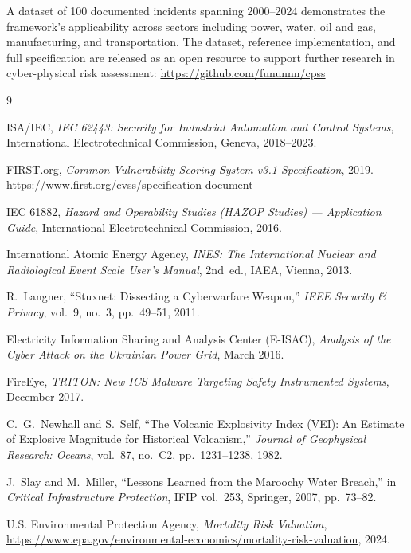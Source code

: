 \documentclass[11pt]{article}
\begin{document}
A dataset of 100 documented incidents spanning 2000--2024 demonstrates
the framework's applicability across sectors including power, water,
oil and gas, manufacturing, and transportation.
The dataset, reference implementation, and full specification are
released as an open resource to support further research in
cyber-physical risk assessment:
\url{https://github.com/fununnn/cpss}


\begin{thebibliography}{9}

ISA/IEC,
\emph{IEC 62443: Security for Industrial Automation and Control Systems},
International Electrotechnical Commission, Geneva, 2018--2023.

FIRST.org,
\emph{Common Vulnerability Scoring System v3.1 Specification},
2019.
\url{https://www.first.org/cvss/specification-document}

IEC 61882,
\emph{Hazard and Operability Studies (HAZOP Studies) ---
Application Guide},
International Electrotechnical Commission, 2016.

International Atomic Energy Agency,
\emph{INES: The International Nuclear and Radiological Event Scale
User's Manual}, 2nd~ed.,
IAEA, Vienna, 2013.

R.~Langner,
``Stuxnet: Dissecting a Cyberwarfare Weapon,''
\emph{IEEE Security \& Privacy}, vol.~9, no.~3, pp.~49--51, 2011.

Electricity Information Sharing and Analysis Center (E-ISAC),
\emph{Analysis of the Cyber Attack on the Ukrainian Power Grid},
March 2016.

FireEye,
\emph{TRITON: New ICS Malware Targeting Safety Instrumented Systems},
December 2017.

C.~G.~Newhall and S.~Self,
``The Volcanic Explosivity Index (VEI): An Estimate of Explosive
Magnitude for Historical Volcanism,''
\emph{Journal of Geophysical Research: Oceans}, vol.~87, no.~C2,
pp.~1231--1238, 1982.

J.~Slay and M.~Miller,
``Lessons Learned from the Maroochy Water Breach,''
in \emph{Critical Infrastructure Protection}, IFIP vol.~253,
Springer, 2007, pp.~73--82.

U.S. Environmental Protection Agency,
\emph{Mortality Risk Valuation},
\url{https://www.epa.gov/environmental-economics/mortality-risk-valuation},
2024.


\end{thebibliography}
\end{document}
